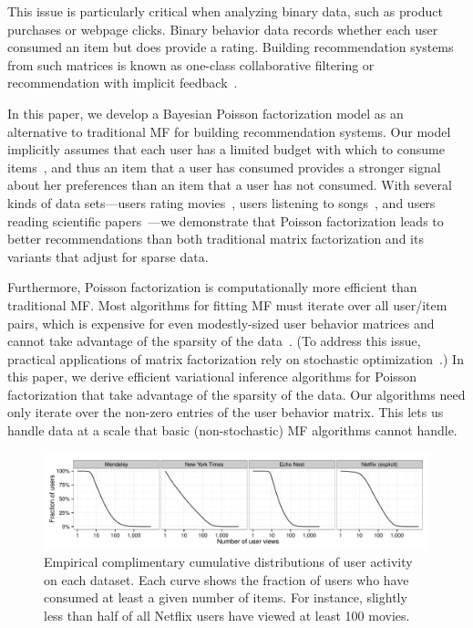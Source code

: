 This issue is particularly critical when analyzing binary data, such
as product purchases or webpage clicks.  Binary behavior data records
whether each user consumed an item but does provide a rating.
Building recommendation systems from such matrices is known as
one-class collaborative filtering or recommendation with implicit
feedback~\cite{Hu:2008p9402,Paquet:2013p9197}.

In this paper, we develop a Bayesian Poisson factorization model as an
alternative to traditional MF for building recommendation systems.
Our model implicitly assumes that each user has a limited budget with
which to consume items~\cite{Goodhardt:1984}, and thus an item that a
user has consumed provides a stronger signal about her preferences
than an item that a user has not consumed.  With several kinds of data
sets---users rating movies~\cite{Herlocker:1999,Koren:2009}, users
listening to songs~\cite{Bertin-Mahieux:2011}, and users reading
scientific papers~\cite{Jack:2010}---we demonstrate that Poisson
factorization leads to better recommendations than both traditional
matrix factorization and its variants that adjust for sparse data.

Furthermore, Poisson factorization is computationally more efficient
than traditional MF.  Most algorithms for fitting MF must iterate over
all user/item pairs, which is expensive for even modestly-sized user
behavior matrices and cannot take advantage of the sparsity of the
data~\cite{Hu:2008p9402}.  (To address this issue, practical applications of matrix
factorization rely on stochastic optimization~\cite{Mairal:2010}.)  In
this paper, we derive efficient variational inference algorithms for
Poisson factorization that take advantage of the sparsity of the
data. Our algorithms need only iterate over the non-zero entries of
the user behavior matrix.  This lets us handle data at a scale that
basic (non-stochastic) MF algorithms cannot handle.



\begin{figure}[t!]
\includegraphics[width=\textwidth]{figures/user_activity_cdf.pdf}
\caption{Empirical complimentary cumulative distributions of user activity on each dataset. Each curve shows the fraction of users who have consumed at least a given number of items. For instance, slightly less than half of all Netflix users have viewed at least 100 movies.}
\label{fig:marginals}
\end{figure}

